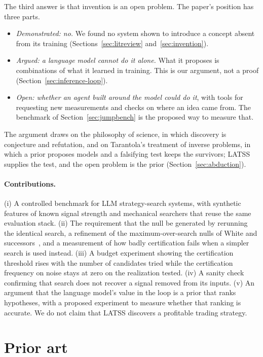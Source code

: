 \documentclass[11pt]{article}
\begin{document}
The third answer is that invention is an open problem. The paper's position has three parts.
\begin{itemize}[leftmargin=1.4em]
\item \emph{Demonstrated: no.} We found no system shown to introduce a concept absent from its training
(Sections~\ref{sec:litreview} and~\ref{sec:invention}).
\item \emph{Argued: a language model cannot do it alone.} What it proposes is combinations of what it
learned in training. This is our argument, not a proof (Section~\ref{sec:inference-loop}).
\item \emph{Open: whether an agent built around the model could do it}, with tools for requesting new
measurements and checks on where an idea came from. The benchmark of Section~\ref{sec:jumpbench} is the
proposed way to measure that.
\end{itemize}
The argument draws on the philosophy of science, in which discovery is conjecture and refutation, and on
Tarantola's treatment of inverse problems, in which a prior proposes models and a falsifying test keeps
the survivors; LATSS supplies the test, and the open problem is the prior
(Section~\ref{sec:abduction}).

\paragraph{Contributions.} (i) A controlled benchmark for LLM strategy-search systems, with synthetic
features of known signal strength and mechanical searchers that reuse the same evaluation stack. (ii)
The requirement that the null be generated by rerunning the identical search, a refinement of the
maximum-over-search nulls of White and successors~\cite{white2000,romanowolf}, and a measurement of how
badly certification fails when a simpler search is used instead. (iii) A budget experiment showing the
certification threshold rises with the number of candidates tried while the certification frequency on
noise stays at zero on the realization tested. (iv) A sanity check confirming that search does not recover a signal removed from
its inputs. (v) An argument that the language model's value in the loop is a prior that ranks
hypotheses, with a proposed experiment to measure whether that ranking is accurate. We do not claim that LATSS discovers a profitable trading strategy.

\section{Prior art}
\label{sec:related}
\end{document}
